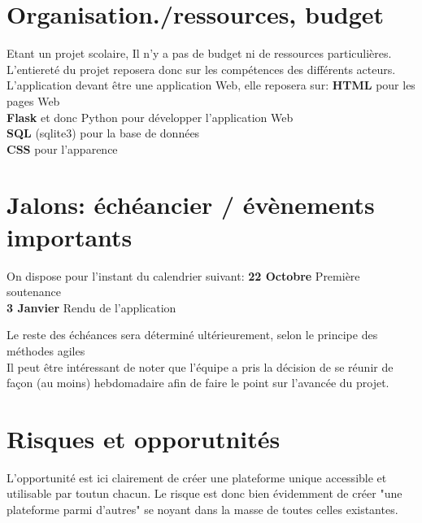 \newpage

\section*{Organisation./ressources, budget}
Etant un projet scolaire, Il n'y a pas de budget ni de ressources particulières. L'entiereté du projet reposera donc sur les compétences des différents acteurs.\\
L'application devant être une application Web, elle reposera sur:
	\textbf{HTML} pour les pages Web \\
	\textbf{Flask} et donc Python pour développer l'application Web \\
	\textbf{SQL} (sqlite3) pour la base de données \\
	\textbf{CSS} pour l'apparence

\section*{Jalons: échéancier / évènements importants}
On dispose pour l'instant du calendrier suivant:
	\textbf{22 Octobre} Première soutenance \\
	\textbf{3 Janvier} Rendu de l'application

Le reste des échéances sera déterminé ultérieurement, selon le principe des méthodes agiles \\
Il peut être intéressant de noter que l'équipe a pris la décision de se réunir de façon (au moins) hebdomadaire afin de faire le point sur l'avancée du projet.


\section*{Risques et opporutnités}
L'opportunité est ici clairement de créer une plateforme unique accessible et utilisable par toutun chacun. Le risque est donc bien évidemment de créer "une plateforme parmi d'autres" se noyant dans la masse de toutes celles existantes.
